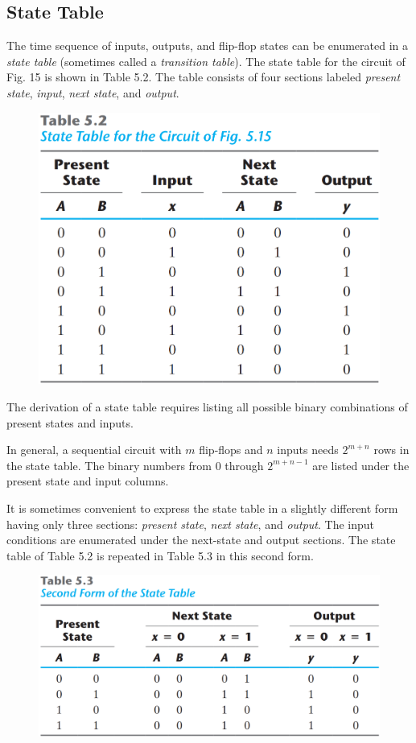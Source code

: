 \subsection{State Table}
\label{subsec:state-table}

The time sequence of inputs, outputs, and flip-flop states can be enumerated in a \textit{state table} (sometimes called a \textit{transition table}). The state table for the circuit of Fig. 15 is shown in Table 5.2. The table consists of four sections labeled \textit{present state}, \textit{input}, \textit{next state}, and \textit{output}.
\begin{figure}[H]
  \centering
  \includegraphics[width=\linewidth]{img/table-5.2.png}
  \label{table:5.2}
\end{figure}
\noindent The derivation of a state table requires listing all possible binary combinations of present states and inputs.

In general, a sequential circuit with $m$ flip-flops and $n$ inputs needs $2^{m + n}$ rows in the state table. The binary numbers from 0 through $2^{m + n - 1}$ are listed under the present state and input columns.

It is sometimes convenient to express the state table in a slightly different form having only three sections: \textit{present state}, \textit{next state}, and \textit{output}. The input conditions are enumerated under the next-state and output sections. The state table of Table 5.2 is  repeated in Table 5.3 in this second form.
\begin{figure}[H]
  \centering
  \includegraphics[width=\linewidth]{img/table-5.3.png}
  \label{table:5.3}
\end{figure}

